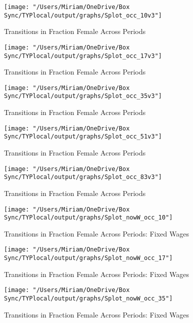 \documentclass[12pt]{article}
\begin{document}
\begin{figure}[H]
\centering
\caption{Transitions in Fraction Female Across Periods}
\label{transitions10}
\texttt{[image: "/Users/Miriam/OneDrive/Box Sync/TYPlocal/output/graphs/Splot\_occ\_10v3"]}
\end{figure}

\begin{figure}[H]
\centering
\caption{Transitions in Fraction Female Across Periods}
\label{transitions17}
\texttt{[image: "/Users/Miriam/OneDrive/Box Sync/TYPlocal/output/graphs/Splot\_occ\_17v3"]}
\end{figure}

\begin{figure}[H]
\centering
\caption{Transitions in Fraction Female Across Periods}
\label{transitions35}
\texttt{[image: "/Users/Miriam/OneDrive/Box Sync/TYPlocal/output/graphs/Splot\_occ\_35v3"]}
\end{figure}

\begin{figure}[H]
\centering
\caption{Transitions in Fraction Female Across Periods}
\label{transitions51}
\texttt{[image: "/Users/Miriam/OneDrive/Box Sync/TYPlocal/output/graphs/Splot\_occ\_51v3"]}
\end{figure}

\begin{figure}[H]
\centering
\caption{Transitions in Fraction Female Across Periods}
\label{transitions83}
\texttt{[image: "/Users/Miriam/OneDrive/Box Sync/TYPlocal/output/graphs/Splot\_occ\_83v3"]}
\end{figure}

\begin{figure}[H]
\centering
\caption{Transitions in Fraction Female Across Periods: Fixed Wages}
\label{ftransitions10}
\texttt{[image: "/Users/Miriam/OneDrive/Box Sync/TYPlocal/output/graphs/Splot\_nowW\_occ\_10"]}
\end{figure}

\begin{figure}[H]
\centering
\caption{Transitions in Fraction Female Across Periods: Fixed Wages}
\label{ftransitions17}
\texttt{[image: "/Users/Miriam/OneDrive/Box Sync/TYPlocal/output/graphs/Splot\_nowW\_occ\_17"]}
\end{figure}

\begin{figure}[H]
\centering
\caption{Transitions in Fraction Female Across Periods: Fixed Wages}
\label{ftransitions35}
\texttt{[image: "/Users/Miriam/OneDrive/Box Sync/TYPlocal/output/graphs/Splot\_nowW\_occ\_35"]}
\end{figure}
\end{document}
